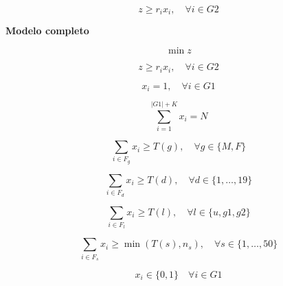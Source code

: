 \begin{equation}
z \geq r_i x_i, \quad \forall i \in G2
\end{equation}

\textbf{Modelo completo}

\begin{equation}
\min z
\end{equation}

\begin{equation}
z \geq r_i x_i, \quad \forall i \in G2
\end{equation}

\begin{equation}
x_i = 1, \quad \forall i \in G1
\end{equation}

\begin{equation}
\sum_{i=1}^{|G1| + K} x_i = N
\end{equation}

\begin{equation}
\sum_{i \in F_g} x_i \geq T(g), \quad \forall g \in \{M,F\}
\end{equation}

\begin{equation}
\sum_{i \in F_d} x_i \geq T(d), \quad \forall d \in \{1,\ldots,19\}
\end{equation}

\begin{equation}
\sum_{i \in F_l} x_i \geq T(l), \quad \forall l \in \{u,g1,g2\}
\end{equation}

\begin{equation}
\sum_{i \in F_s} x_i \geq \min(T(s),n_s), \quad \forall s \in \{1,\ldots,50\}
\end{equation}

\begin{equation}
x_i \in \{0,1\} \quad \forall i \in G1
\end{equation}
